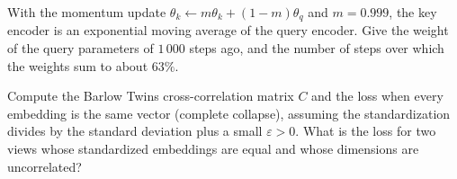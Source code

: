 \begin{notechapter}
\begin{exercise}\label{contrastive-practice:exr:4}
With the momentum update $\theta_k\leftarrow m\theta_k + (1 - m)\theta_q$ and $m = 0.999$, the key encoder is an exponential moving average of the
query encoder. Give the weight of the query parameters of $1\,000$ steps ago, and the number of steps over
which the weights sum to about $63\%$.
\end{exercise}

\begin{exercise}\label{contrastive-practice:exr:5}
Compute the Barlow Twins cross-correlation matrix $C$ and the loss when every embedding is the same vector
(complete collapse), assuming the standardization divides by the standard deviation plus a small
$\varepsilon > 0$. What is the loss for two views whose standardized embeddings are equal and whose dimensions
are uncorrelated?
\end{exercise}
\end{notechapter}
